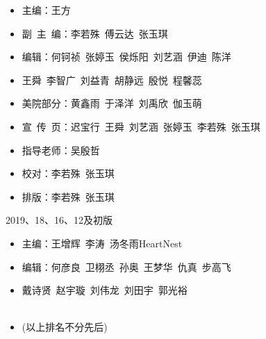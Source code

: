 \begin{titlepage}
\begin{itemize}
\item[] 主\qquad 编：王\quad 方
\item[] 副\, 主\, 编：李若殊\, 傅云达\, 张玉琪\
\item[] 编\qquad 辑：何钶祯\, 张婷玉\, 侯烁阳\, 刘艺涵\, 伊\quad 迪\, 陈\quad 洋
\item[] \hspace*{2.1cm}王\quad 舜\, 李智广\, 刘益青\, 胡静远\, 殷\quad 悦\, 程馨蕊
\item[] 美院部分：黄鑫雨\, 于泽洋\, 刘禹欣\, 伽玉萌
\item[] 宣\, 传\, 页：迟宝行\, 王\quad 舜\, 刘艺涵\, 张婷玉\, 李若殊\, 张玉琪
\item[] 指导老师：吴殷哲
\item[] 校\qquad 对：李若殊\, 张玉琪
\item[] 排\qquad 版：李若殊\, 张玉琪
\end{itemize}
\vspace{2cm}\centerline{2019、18、16、12及初版} 
\begin{itemize}

\item[] 主\qquad 编：王增辉\, 李\quad 涛\, 汤冬雨\hspace{0.3cm}HeartNest
\item[] 编\qquad 辑：何彦良\, 卫栩丞\, 孙\quad 奥\, 王梦华\, 仇\quad 真\, 步高飞
\item[] \hspace*{2.1cm}戴诗贤\, 赵宇璇\, 刘伟龙\, 刘田宇\, 郭光裕
\\
\\
\item[] (以上排名不分先后)
\end{itemize}



\clearpage{\pagestyle{empty}\cleardoublepage}%
\end{titlepage}


\clearpage{\pagestyle{empty}\cleardoublepage}

{
\hypersetup{linkcolor=black}
\tableofcontents                        %

}
\clearpage{\pagestyle{empty}\cleardoublepage}
